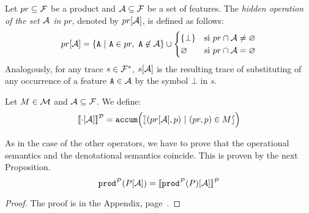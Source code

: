 \bdfn
  Let $pr\subseteq{\cal F}$ be a product and ${\cal A}\subseteq{\cal F}$
  be a set of features. The \emph{hidden operation of the set ${\cal A}$
    in $pr$}, denoted by $pr[{\cal A}]$, is defined as follows:
  \begin{displaymath}
    pr\hide{\calA} = \{\fA\ |\ \fA\in pr,\
    \fA\not\in\calA\}\cup
    \begin{cases}
      \{\bot\} & \mbox{si } pr\cap\calA\neq\emptyset\\
      \emptyset & \mbox{si } pr\cap\calA=\emptyset\\
    \end{cases}
  \end{displaymath}
  Analogously, for any trace $s\in{\cal F}^{*}$, $s[{\cal A}]$ is the
  resulting
  trace of 
  substituting of any  occurrence of a feature ${\mathtt{A}}\in{\cal A}$ by
  the symbol $\bot$ in $s$. 
\edfn

\bdfn
  Let $M\in{\cal M}$ and ${\cal A}\subseteq{\cal F}$. We define:
  \begin{displaymath}
    [\![\cdot[{\cal A}]]\!]^{\cal P} = \mathtt{accum}\Bigl(\lbag(pr[{\cal A}],p)\
    |\ (pr,p)\in M\rbag \Bigr)
  \end{displaymath}
\edfn

As in the case of the other operators, we have to prove that the
operational semantics and the denotational semantics coincide. This is
proven by the next Proposition.
\bprop\label{prop:hid}
  \begin{displaymath}
    \mathtt{prod}^{\cal P}(P[{\cal A}])  = [\![\mathtt{prod}^{\cal P}(P)[{\cal A}]]\!]^{\cal P}
  \end{displaymath}
  \begin{proof}
    The proof is in the Appendix, page~\pageref{prof:prop:hid}.
  \end{proof}
\eprop


